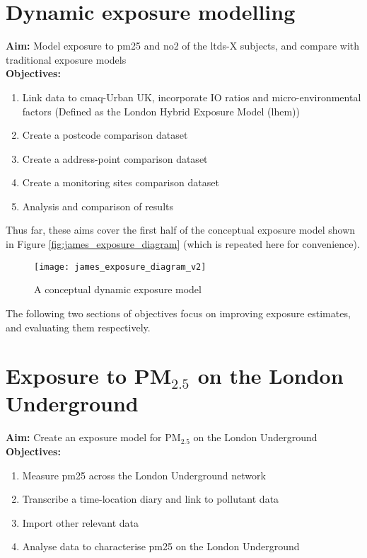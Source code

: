 \section{Dynamic exposure modelling}

\textbf{Aim:} Model exposure to \gls{pm25} and \gls{no2} of the \gls{ltds}-X subjects, and compare  with traditional exposure models \\
\textbf{Objectives:}

\begin{enumerate}
\item Link data to \gls{cmaq}-Urban UK, incorporate IO ratios and micro-environmental factors (Defined as the London Hybrid Exposure Model (\gls{lhem}))
\item Create a postcode comparison dataset
\item Create a address-point comparison dataset
\item Create a monitoring sites comparison dataset
\item Analysis and comparison of results
\end{enumerate}

Thus far, these aims cover the first half of the conceptual exposure model shown in Figure \ref{fig:james_exposure_diagram} (which is repeated here for convenience). 

\begin{figure}[H]
\centering
\texttt{[image: james\_exposure\_diagram\_v2]}
\caption{A conceptual dynamic exposure model}
\label{fig:james_exposure_diagram_v2}
\end{figure}

The following two sections of objectives focus on improving exposure estimates, and evaluating them respectively.

\section{Exposure to \texorpdfstring{PM$_{2.5}$}{} on the London Underground}

\textbf{Aim:} Create an exposure model for PM$_{2.5}$ on the London Underground \\
\textbf{Objectives:}

\begin{enumerate}
\item Measure \gls{pm25} across the London Underground network
\item Transcribe a time-location diary and link to pollutant data
\item Import other relevant data
\item Analyse data to characterise \gls{pm25} on the London Underground
\end{enumerate}

